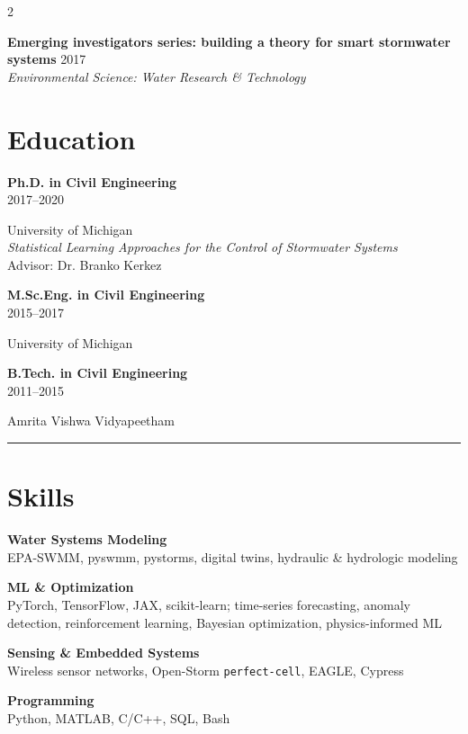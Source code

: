 \documentclass{article}
\newcommand{\degreeyear}[2]{
  {\textbf{#1}}\\
  {\small\textcolor{tuftegray}{#2}}
}
\newcommand{\divider}{\textcolor{tuftegray}{\rule{\linewidth}{0.5pt}}}
\newcommand{\publication}[3]{
  \textbf{#1} \hfill \textcolor{tuftegray}{#2}\\
  {\small\textit{#3}}\\[0.5em]
}
\begin{document}
\begin{paracol}{2}
\publication{Emerging investigators series: building a theory for smart stormwater systems}{2017}{Environmental Science: Water Research \& Technology}


\switchcolumn

\begin{flushleft}

\section{Education}
\vspace{0.5em}
\degreeyear{Ph.D. in Civil Engineering}{2017--2020}
University of Michigan\\
\vspace{0.2em}
{\small\textit{Statistical Learning Approaches for the Control of Stormwater Systems}}\\
{\small Advisor: Dr. Branko Kerkez}

\vspace{0.8em}
\degreeyear{M.Sc.Eng. in Civil Engineering}{2015--2017}
University of Michigan

\vspace{0.8em}
\degreeyear{B.Tech. in Civil Engineering}{2011--2015}
Amrita Vishwa Vidyapeetham
\vspace{0.5em}
\divider
\vspace{0.5em}

\section{Skills}
\vspace{0.5em}
\textbf{Water Systems Modeling}\\
{\small EPA-SWMM, pyswmm, pystorms, digital twins, hydraulic \& hydrologic modeling}
\vspace{0.6em}

\textbf{ML \& Optimization}\\
{\small PyTorch, TensorFlow, JAX, scikit-learn; time-series forecasting, anomaly detection, reinforcement learning, Bayesian optimization, physics-informed ML}
\vspace{0.6em}

\textbf{Sensing \& Embedded Systems}\\
{\small Wireless sensor networks, Open-Storm \texttt{perfect-cell}, EAGLE, Cypress}
\vspace{0.6em}

\textbf{Programming}\\
{\small Python, MATLAB, C/C++, SQL, Bash}
\vspace{0.6em}


\end{flushleft}
\end{paracol}
\end{document}
